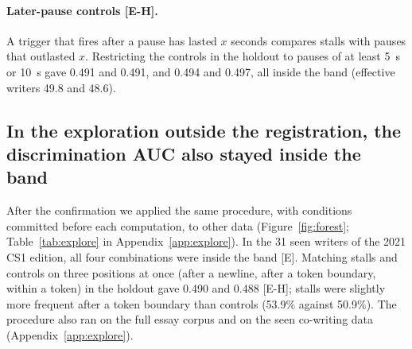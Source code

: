 \paragraph{Later-pause controls [E-H].} A trigger that fires after a pause has lasted $x$ seconds compares stalls with
pauses that outlasted $x$. Restricting the controls in the holdout to pauses of at least 5~s or 10~s gave 0.491 and 0.491,
and 0.494 and 0.497, all inside the band (effective writers 49.8 and 48.6).

\subsection{In the exploration outside the registration, the discrimination AUC also stayed inside the band}
\label{sec:res-explore}

After the confirmation we applied the same procedure, with conditions committed before each computation, to other data
(Figure~\ref{fig:forest}; Table~\ref{tab:explore} in Appendix~\ref{app:explore}). In the 31 seen writers of the 2021 CS1 edition, all four combinations were inside the band
[E]. Matching stalls and controls on three positions at once (after a newline, after a token boundary, within a token)
in the holdout gave 0.490 and 0.488 [E-H]; stalls were slightly more frequent after a token boundary than controls (53.9\%
against 50.9\%). The procedure also ran on the full essay corpus and on the seen co-writing data (Appendix~\ref{app:explore}).

